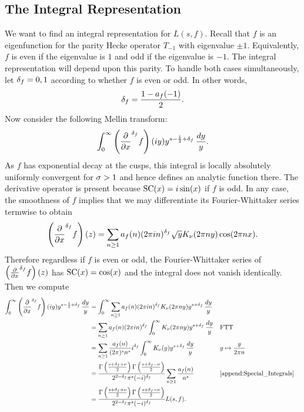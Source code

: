     \subsection*{The Integral Representation}
      We want to find an integral representation for $L(s,f)$. Recall that $f$ is an eigenfunction for the parity Hecke operator $T_{-1}$ with eigenvalue $\pm 1$. Equivalently, $f$ is even if the eigenvalue is $1$ and odd if the eigenvalue is $-1$. The integral representation will depend upon this parity. To handle both cases simultaneously, let $\delta_{f} = 0,1$ according to whether $f$ is even or odd. In other words,
      \[
        \delta_{f} = \frac{1-a_{f}(-1)}{2}.
      \]
      Now consider the following Mellin transform:
      \[
        \int_{0}^{\infty}\left(\frac{\partial}{\partial x}^{\delta_{f}}f\right)(iy)y^{s-\frac{1}{2}+\delta_{f}}\,\frac{dy}{y}.
      \]
      As $f$ has exponential decay at the cusps, this integral is locally absolutely uniformly convergent for $\sigma > 1$ and hence defines an analytic function there. The derivative operator is present because $\operatorname{\mathrm{SC}}(x) = i\sin(x)$ if $f$ is odd. In any case, the smoothness of $f$ implies that we may differentiate its Fourier-Whittaker series termwise to obtain
      \[
        \left(\frac{\partial}{\partial x}^{\delta_{f}}f\right)(z) = \sum_{n \ge 1}a_{f}(n)(2\pi in)^{\delta_{f}}\sqrt{y}K_{\nu}(2\pi ny)\cos(2\pi nx).
      \]
      Therefore regardless if $f$ is even or odd, the Fourier-Whittaker series of $\left(\frac{\partial}{\partial x}^{\delta_{f}}f\right)(z)$ has $\operatorname{\mathrm{SC}}(x) = \cos(x)$ and the integral does not vanish identically. Then we compute
      \begin{align*}
        \int_{0}^{\infty}\left(\frac{\del}{\del x}^{\d_{f}}f\right)(iy)y^{s-\frac{1}{2}+\d_{f}}\,\frac{dy}{y} &= \int_{0}^{\infty}\sum_{n \ge 1}a_{f}(n)(2\pi in)^{\d_{f}}K_{\nu}(2\pi ny)y^{s+\d_{f}}\,\frac{dy}{y} \\
        &= \sum_{n \ge 1}a_{f}(n)(2\pi in)^{\d_{f}}\int_{0}^{\infty}K_{\nu}(2\pi ny)y^{s+\d_{f}}\,\frac{dy}{y} &&\text{FTT} \\
        &= \sum_{n \ge 1}\frac{a_{f}(n)}{(2\pi)^{s}n^{s}}i^{\d_{f}}\int_{0}^{\infty}K_{\nu}(y)y^{s+\d_{f}}\,\frac{dy}{y} &&\text{$y \mapsto \frac{y}{2\pi n}$} \\
        &= \frac{\G\left(\frac{s+\d_{f}+\nu}{2}\right)\G\left(\frac{s+\d_{f}-\nu}{2}\right)}{2^{2-\d_{f}}\pi^{s}(-i)^{\d_{f}}}\sum_{n \ge 1}\frac{a_{f}(n)}{n^{s}} && \text{\cref{append:Special_Integrals}} \\
        &= \frac{\G\left(\frac{s+\d_{f}+\nu}{2}\right)\G\left(\frac{s+\d_{f}-\nu}{2}\right)}{2^{2-\d_{f}}\pi^{s}(-i)^{\d_{f}}}L(s,f).
      \end{align*}
